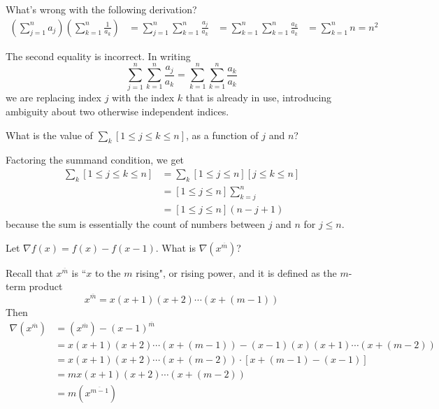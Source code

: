 \documentclass[12pt]{article}
\newenvironment{ex}[2][Exercise]{\begin{trivlist}
		\item[\hskip \labelsep {\bfseries #1}\hskip \labelsep {\bfseries #2.}]}{\end{trivlist}}
\newenvironment{sol}[1][Solution]{\begin{trivlist}
		\item[\hskip \labelsep {\bfseries #1:}]}{\end{trivlist}}
\begin{document}
\begin{ex}{5}
	What's wrong with the following derivation?
	\begin{align*}
		\left(\sum_{j=1}^{n}a_j\right)
		\left(\sum_{k=1}^{n}\frac{1}{a_k}\right)
		&=\sum_{j=1}^{n}\sum_{k=1}^{n}\frac{a_j}{a_k}
		&=\sum_{k=1}^{n}\sum_{k=1}^{n}\frac{a_k}{a_k}
		&=\sum_{k=1}^{n}n=n^2
	\end{align*}
\end{ex}

\begin{sol}
	The second equality is incorrect. In writing
	\[
	\sum_{j=1}^{n}\sum_{k=1}^{n}\frac{a_j}{a_k}
	=\sum_{k=1}^{n}\sum_{k=1}^{n}\frac{a_k}{a_k}
	\]
	we are replacing index $j$ with the index $k$ that is already in use,
	introducing ambiguity about two otherwise independent indices.
\end{sol}

\begin{ex}{6}
	What is the value of $\sum_{k}[1\leq j\leq k\leq n]$, as a function of $j$ and $n$?
\end{ex}

\begin{sol}
	Factoring the summand condition, we get
	\begin{align*}
		\sum_{k}[1\leq j\leq k\leq n]&=\sum_{k}[1\leq j\leq n][j\leq k\leq n]\\
		&=[1\leq j\leq n]\sum_{k=j}^{n}\\
		&=[1\leq j\leq n](n-j+1)
	\end{align*}
	because the sum is essentially the count of numbers between $j$ and $n$ for $j\leq n$.
\end{sol}

\begin{ex}{7}
	Let $\nabla f(x)=f(x)-f(x-1)$. What is $\nabla \left(x^{\overline{m}}\right)$?
\end{ex}

\begin{sol}
	Recall that $x^{\overline{m}}$ is ``$x$ to the $m$ rising", or rising power, and it is defined
	as the $m$-term product
	\[
	x^{\overline{m}}=x(x+1)(x+2)\cdots (x+(m-1))
	\]
	Then
	\begin{align*}
		\nabla \left(x^{\overline{m}}\right)&=\left(x^{\overline{m}}\right)-\left(x-1\right)^{\overline{m}}\\
		&=x(x+1)(x+2)\cdots (x+(m-1))-(x-1)(x)(x+1)\cdots (x+(m-2))\\
		&=x(x+1)(x+2)\cdots(x+(m-2))\cdot \left[x+(m-1)-(x-1)\right]\\
		&=mx(x+1)(x+2)\cdots (x+(m-2))\\
		&=m\left(x^{\overline{m-1}}\right)
	\end{align*}
\end{sol}
\end{document}
